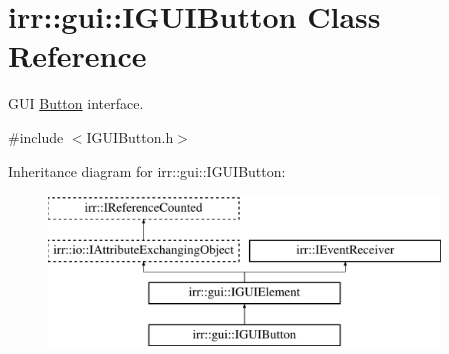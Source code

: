 \hypertarget{classirr_1_1gui_1_1IGUIButton}{}\section{irr\+:\+:gui\+:\+:I\+G\+U\+I\+Button Class Reference}
\label{classirr_1_1gui_1_1IGUIButton}


G\+UI \hyperlink{classButton}{Button} interface.  




{\ttfamily \#include $<$I\+G\+U\+I\+Button.\+h$>$}

Inheritance diagram for irr\+:\+:gui\+:\+:I\+G\+U\+I\+Button\+:\begin{figure}[H]
\begin{center}
\leavevmode
\includegraphics[height=4.000000cm]{classirr_1_1gui_1_1IGUIButton}
\end{center}
\end{figure}
